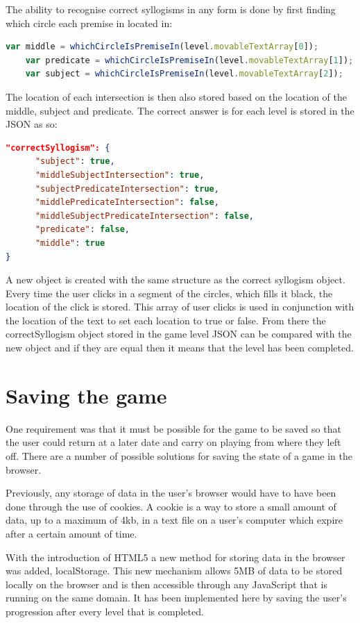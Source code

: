 \documentclass[12pt,a4paper]{report}
\begin{document}
The ability to recognise correct syllogisms in any form is done by first finding which circle each premise in located in:

\begin{lstlisting}[language=JavaScript]
    var middle = whichCircleIsPremiseIn(level.movableTextArray[0]);
    var predicate = whichCircleIsPremiseIn(level.movableTextArray[1]);
    var subject = whichCircleIsPremiseIn(level.movableTextArray[2]);
\end{lstlisting}

The location of each intersection is then also stored based on the location of the middle, subject and predicate.
The correct answer is for each level is stored in the JSON as so:
\begin{lstlisting}[language=json]
"correctSyllogism": {
      "subject": true,
      "middleSubjectIntersection": true,
      "subjectPredicateIntersection": true,
      "middlePredicateIntersection": false,
      "middleSubjectPredicateIntersection": false,
      "predicate": false,
      "middle": true
}
\end{lstlisting}

A new object is created with the same structure as the correct syllogism object.
Every time the user clicks in a segment of the circles, which fills it black, the location of the click is stored. This array of user clicks is used in conjunction with the location of the text to set each location to true or false. From there the correctSyllogism object stored in the game level JSON can be compared with the new object and if they are equal then it means that the level has been completed.

\section{Saving the game}
One requirement was that it must be possible for the game to be saved so that the user could return at a later date and carry on playing from where they left off. There are a number of possible solutions for saving the state of a game in the browser.

Previously, any storage of data in the user's browser would have to have been done through the use of cookies. A cookie is a way to store a small amount of data, up to a maximum of 4kb, in a text file on a user's computer which expire after a certain amount of time.

With the introduction of HTML5 a new method for storing data in the browser was added, localStorage. This new mechanism allows 5MB of data to be stored locally on the browser and is then accessible through any JavaScript that is running on the same domain. It has been implemented here by saving the user's progression after every level that is completed.
\end{document}
